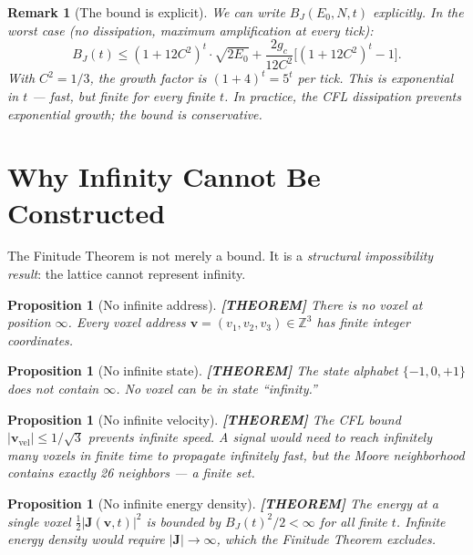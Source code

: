 \documentclass[11pt]{article}
\theoremstyle{tight}
\newtheorem{proposition}[theorem]{Proposition}
\theoremstyle{plainroman}
\newtheorem{remark}[theorem]{Remark}
\newcommand{\Z}{\mathbb{Z}}
\begin{document}
\begin{remark}[The bound is explicit]
We can write $B_J(E_0,N,t)$ explicitly.
In the worst case (no dissipation, maximum amplification at every tick):
\[
B_J(t)\le (1+12C^2)^t\cdot\sqrt{2E_0}+\frac{2g_c}{12C^2}\bigl[(1+12C^2)^t-1\bigr].
\]
With $C^2=1/3$, the growth factor is $(1+4)^t=5^t$ per tick.
This is exponential in $t$ --- fast, but \emph{finite} for every finite $t$.
In practice, the CFL dissipation prevents exponential growth; the bound is conservative.
\end{remark}

\section{Why Infinity Cannot Be Constructed}

The Finitude Theorem is not merely a bound.
It is a \emph{structural impossibility result}: the lattice cannot represent infinity.

\begin{proposition}[No infinite address]\label{prop:address}
\textbf{[THEOREM]}
There is no voxel at position $\infty$.
Every voxel address $\mathbf v=(v_1,v_2,v_3)\in\Z^3$ has finite integer coordinates.
\end{proposition}

\begin{proposition}[No infinite state]\label{prop:state}
\textbf{[THEOREM]}
The state alphabet $\{-1,0,+1\}$ does not contain $\infty$.
No voxel can be in state ``infinity.''
\end{proposition}

\begin{proposition}[No infinite velocity]\label{prop:velocity}
\textbf{[THEOREM]}
The CFL bound $|\mathbf v_{\mathrm{vel}}|\le 1/\sqrt{3}$ prevents infinite speed.
A signal would need to reach infinitely many voxels in finite time to propagate infinitely fast, but the Moore neighborhood contains exactly 26 neighbors --- a finite set.
\end{proposition}

\begin{proposition}[No infinite energy density]\label{prop:energy}
\textbf{[THEOREM]}
The energy at a single voxel $\frac{1}{2}|\mathbf J(\mathbf v,t)|^2$ is bounded by $B_J(t)^2/2<\infty$ for all finite $t$.
Infinite energy density would require $|\mathbf J|\to\infty$, which the Finitude Theorem excludes.
\end{proposition}
\end{document}
